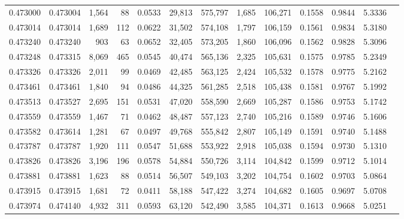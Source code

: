 \begin{tabular}{rrrrrrrrrrrrr}
0.473000 & 0.473004 & 1,564 &    88 &                                     0.0533 &  29,813 & 575,797 &   1,685 & 106,271 & 0.1558 & 0.9844 & 5.3336 \\
0.473014 & 0.473014 & 1,689 &   112 &                                     0.0622 &  31,502 & 574,108 &   1,797 & 106,159 & 0.1561 & 0.9834 & 5.3180 \\
0.473240 & 0.473240 &   903 &    63 &                                     0.0652 &  32,405 & 573,205 &   1,860 & 106,096 & 0.1562 & 0.9828 & 5.3096 \\
0.473248 & 0.473315 & 8,069 &   465 &                                     0.0545 &  40,474 & 565,136 &   2,325 & 105,631 & 0.1575 & 0.9785 & 5.2349 \\
0.473326 & 0.473326 & 2,011 &    99 &                                     0.0469 &  42,485 & 563,125 &   2,424 & 105,532 & 0.1578 & 0.9775 & 5.2162 \\
0.473461 & 0.473461 & 1,840 &    94 &                                     0.0486 &  44,325 & 561,285 &   2,518 & 105,438 & 0.1581 & 0.9767 & 5.1992 \\
0.473513 & 0.473527 & 2,695 &   151 &                                     0.0531 &  47,020 & 558,590 &   2,669 & 105,287 & 0.1586 & 0.9753 & 5.1742 \\
0.473559 & 0.473559 & 1,467 &    71 &                                     0.0462 &  48,487 & 557,123 &   2,740 & 105,216 & 0.1589 & 0.9746 & 5.1606 \\
0.473582 & 0.473614 & 1,281 &    67 &                                     0.0497 &  49,768 & 555,842 &   2,807 & 105,149 & 0.1591 & 0.9740 & 5.1488 \\
0.473787 & 0.473787 & 1,920 &   111 &                                     0.0547 &  51,688 & 553,922 &   2,918 & 105,038 & 0.1594 & 0.9730 & 5.1310 \\
0.473826 & 0.473826 & 3,196 &   196 &                                     0.0578 &  54,884 & 550,726 &   3,114 & 104,842 & 0.1599 & 0.9712 & 5.1014 \\
0.473881 & 0.473881 & 1,623 &    88 &                                     0.0514 &  56,507 & 549,103 &   3,202 & 104,754 & 0.1602 & 0.9703 & 5.0864 \\
0.473915 & 0.473915 & 1,681 &    72 &                                     0.0411 &  58,188 & 547,422 &   3,274 & 104,682 & 0.1605 & 0.9697 & 5.0708 \\
0.473974 & 0.474140 & 4,932 &   311 &                                     0.0593 &  63,120 & 542,490 &   3,585 & 104,371 & 0.1613 & 0.9668 & 5.0251 \\

\end{tabular}

